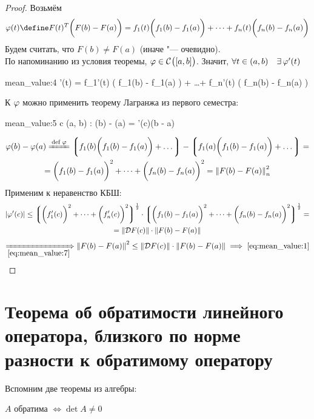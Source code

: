 \begin{proof}
	Возьмём
	$$ \vphi(t) \define F(t)^T \bigg( F(b) - F(a) \bigg) = f_1(t) \bigg( f_1(b) - f_1(a) \bigg) + \dots + f_n(t) \bigg( f_n(b) - f_n(a) \bigg) $$
	Будем считать, что $ F(b) \ne F(a) $ (иначе "--- очевидно). \\
	По напоминанию из условия теоремы, $ \varphi \in \mathcal{C}^{} \big( {[a, b]} \big)  $. Значит, $ \forall t \in (a, b) \quad \exists\, \varphi'(t) $
	\begin{equ}{mean_value:4}
		\vphi'(t) = f_1'(t) \bigg( f_1(b) - f_1(a) \bigg) + \dots + f_n'(t) \bigg( f_n(b) - f_n(a) \bigg)
	\end{equ}
	К $ \varphi $ можно применить теорему Лагранжа из первого семестра:
	\begin{equ}{mean_value:5}
		\exist c \in (a, b) : \quad \vphi(b) - \vphi(a) = \vphi'(c)(b - a)
	\end{equ}
	\begin{multline}\lbl{mean_value:7}
		\vphi(b) - \vphi(a) \bdefeq\vphi \bigg\lgroup f_1(b) \bigg(f_1(b) - f_1(a) \bigg) + \dots \bigg\rgroup - \bigg\lgroup f_1(a) \bigg( f_1(b) - f_1(a) \bigg) + \dots \bigg\rgroup = \\
		= \bigg( f_1(b) - f_1(a) \bigg)^2 + \dots + \bigg( f_n(b) - f_n(a) \bigg)^2 = \norm{F(b) - F(a)}_n^2
	\end{multline}
	Применим к  неравенство КБШ:
	\begin{multline*}
		|\varphi'(c)| \le \bigg\lgroup \bigg( f_1'(c) \bigg)^2 + \dots + \bigg(f_n'(c) \bigg)^2 \bigg\rgroup^\frac12 \cdot \bigg\lgroup \bigg( f_1(b) - f_1(a) \bigg)^2 + \dots + \bigg( f_n(b) - f_n(a) \bigg)^2 \bigg\rgroup^\frac12 = \\
		= \left\|{\mathcal{D}F(c)}\right\| \cdot \left\|{F(b) - F(a)}\right\|
	\end{multline*}
	$$ \underimp{\eref{mean_value:7}} \norm{F(b) - F(a)}^2 \le \norm{\mc{D}F(c)} \cdot \norm{F(b) - F(a)} \implies \eref{mean_value:1} $$
\end{proof}

\section{Теорема об обратимости линейного оператора, близкого по норме разности к обратимому оператору}

Вспомним две теоремы из алгебры:

\begin{remind}
	$ A $ обратима $ \iff \det A \ne 0 $
\end{remind}

